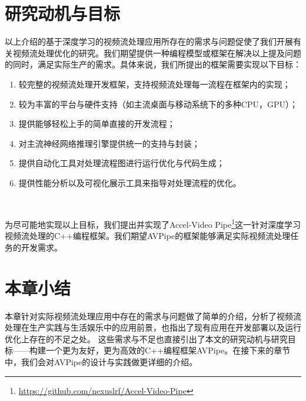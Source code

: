 \section{研究动机与目标}
以上介绍的基于深度学习的视频流处理应用所存在的需求与问题促使了我们开展有关视频流处理优化的研究。我们期望提供一种编程模型或框架在解决以上提及问题的同时，满足实际生产的需求。具体来说，我们所提出的框架需要实现以下目标：
\begin{enumerate}
    \item 较完整的视频流处理开发框架，支持视频流处理每一流程在框架内的实现；
    \item 较为丰富的平台与硬件支持（如主流桌面与移动系统下的多种CPU，GPU）；
    \item 提供能够轻松上手的简单直接的开发流程；
    \item 对主流神经网络推理引擎提供统一的支持与封装；
    \item 提供自动化工具对处理流程图进行运行优化与代码生成；
    \item 提供性能分析以及可视化展示工具来指导对处理流程的优化。
\end{enumerate}\par~\par
为尽可能地实现以上目标，我们提出并实现了Accel-Video Pipe\footnote{\url{https://github.com/nexuslrf/Accel-Video-Pipe}}这一针对深度学习视频流处理的C++编程框架。我们期望AVPipe的框架能够满足实际视频流处理任务的开发需求。

\section{本章小结}
本章针对实际视频流处理应用中存在的需求与问题做了简单的介绍，分析了视频流处理在生产实践与生活娱乐中的应用前景，也指出了现有应用在开发部署以及运行优化上存在的不足之处。
这些需求与不足也直接引出了本文的研究动机与研究目标——构建一个更为友好，更为高效的C++编程框架AVPipe。在接下来的章节中，我们会对AVPipe的设计与实践做更详细的介绍。